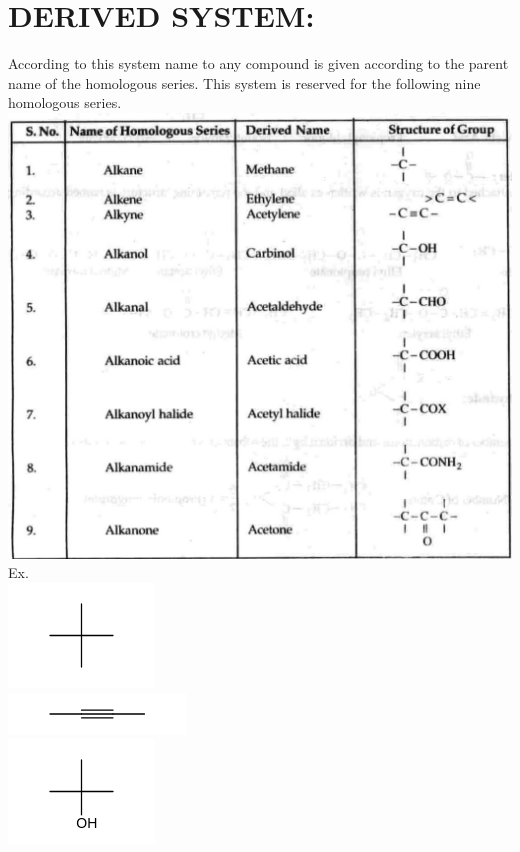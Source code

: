 \documentclass[10pt]{article}
\begin{document}
\section*{DERIVED SYSTEM:}
According to this system name to any compound is given according to the parent name of the homologous series. This system is reserved for the following nine homologous series.\\
\includegraphics[max width=\textwidth, center]{2025_01_28_8470952b98110cec3aabg-016}\\
Ex.\\
\includegraphics{smile-d931cbc443b2ba338bf41680aec6f71a27c670dc}\\
\includegraphics{smile-a0c0ebc6fa6bc0fdc48afac51c586bd7eb1cb9aa}\\
\includegraphics{smile-3e3353bb5c6dd976261b284da8b4c11a9493391c}\\
\end{document}
